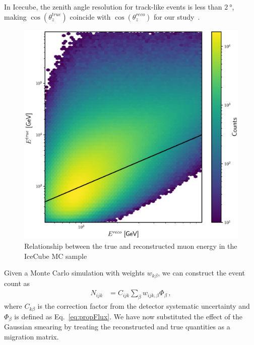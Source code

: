 \documentclass{article}
\newcommand{\zreco}{\ensuremath{\cos{(\theta_z^{reco})}}}
\newcommand{\ztrue}{\ensuremath{\cos{(\theta_z^{true})}}}
\begin{document}
In Icecube, the zenith angle resolution for track-like events is less than $\SI{2}{\degree}$, making $\ztrue$ coincide with $\zreco$ for our study~\cite{IC2020}.
\begin{figure}[!tb]
    \begin{center}
       \includegraphics[width=0.48\linewidth]{figures/IC_MC_counts.eps}
    \end{center}
    \caption{Relationship between the true and reconstructed muon energy in the IceCube MC sample}\label{fig:IC_MC_counts}
 \end{figure}

Given a Monte Carlo simulation with weights $w_{k\beta}$, we can construct the event count as
\begin{align}\label{eq:MCevents}
    N_{ijk} &= C_{ijk}\sum_{\beta}w_{ijk,\beta} \Phi_\beta\,,
\end{align}
where $C_{k\beta}$ is the correction factor from the detector systematic uncertainty and $\Phi_\beta$ is defined as Eq.~\ref{eq:propFlux}. We have now substituted the effect of the Gaussian smearing 
by treating the reconstructed and true quantities as a migration matrix. 
\end{document}
